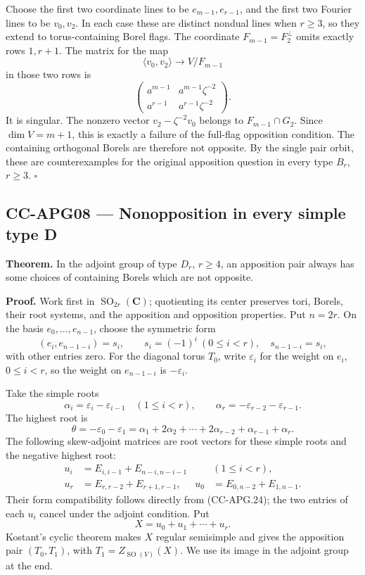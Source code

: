 Choose the first two coordinate lines to be \(e_{m-1},e_{r-1}\), and the
first two Fourier lines to be \(v_0,v_2\). In each case these are
distinct nondual lines when \(r\geq3\), so they extend to
torus-containing Borel flags. The coordinate \(F_{m-1}=F_2^\perp\) omits
exactly rows \(1,r+1\). The matrix for the map \[
 \langle v_0,v_2\rangle\longrightarrow V/F_{m-1}
\] in those two rows is \[
 \begin{pmatrix}
 a^{m-1}&a^{m-1}\zeta^{-2}\\
 a^{r-1}&a^{r-1}\zeta^{-2}
 \end{pmatrix}.
\] It is singular. The nonzero vector \(v_2-\zeta^{-2}v_0\) belongs to
\(F_{m-1}\cap G_2\). Since \(\dim V=m+1\), this is exactly a failure of
the full-flag opposition condition. The containing orthogonal Borels are
therefore not opposite. By the single pair orbit, these are
counterexamples for the original apposition question in every type
\(B_r\), \(r\geq3\). \(\square\)

\subsection{CC-APG08 --- Nonopposition in every simple type
D}\label{cc-apg08-nonopposition-in-every-simple-type-d}

\textbf{Theorem.} In the adjoint group of type \(D_r\), \(r\geq4\), an
apposition pair always has some choices of containing Borels which are
not opposite.

\textbf{Proof.} Work first in \(\operatorname{SO}_{2r}(\mathbf C)\);
quotienting its center preserves tori, Borels, their root systems, and
the apposition and opposition properties. Put \(n=2r\). On the basis
\(e_0,\ldots,e_{n-1}\), choose the symmetric form \[
 (e_i,e_{n-1-i})=s_i,\qquad
 s_i=(-1)^i\ (0\leq i<r),\quad
 s_{n-1-i}=s_i,
 \tag{CC-APG.24}
\] with other entries zero. For the diagonal torus \(T_0\), write
\(\varepsilon_i\) for the weight on \(e_i\), \(0\leq i<r\), so the
weight on \(e_{n-1-i}\) is \(-\varepsilon_i\).

Take the simple roots \[
 \alpha_i=\varepsilon_i-\varepsilon_{i-1}\quad(1\leq i<r),
 \qquad \alpha_r=-\varepsilon_{r-2}-\varepsilon_{r-1}.
\] The highest root is \[
 \theta=-\varepsilon_0-\varepsilon_1
 =\alpha_1+2\alpha_2+\cdots+2\alpha_{r-2}
    +\alpha_{r-1}+\alpha_r.
\] The following skew-adjoint matrices are root vectors for these simple
roots and the negative highest root: \[
\begin{aligned}
 u_i&=E_{i,i-1}+E_{n-i,n-i-1} &&(1\leq i<r),\\
 u_r&=E_{r,r-2}+E_{r+1,r-1},&
 u_0&=E_{0,n-2}+E_{1,n-1}.
\end{aligned}
\] Their form compatibility follows directly from (CC-APG.24); the two
entries of each \(u_i\) cancel under the adjoint condition. Put \[
 X=u_0+u_1+\cdots+u_r.
 \tag{CC-APG.25}
\] Kostant's cyclic theorem makes \(X\) regular semisimple and gives the
apposition pair \((T_0,T_1)\), with \(T_1=Z_{\operatorname{SO}(V)}(X)\).
We use its image in the adjoint group at the end.

